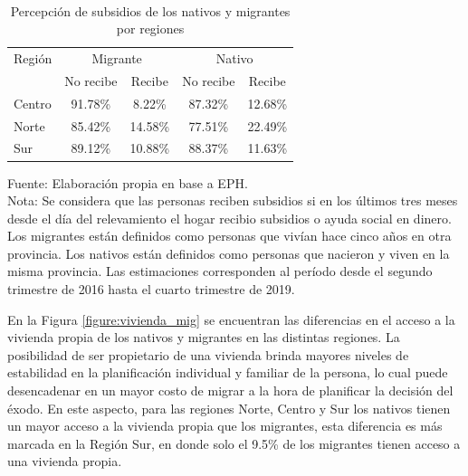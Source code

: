 \documentclass[12pt,a4paper]{article}
\begin{document}
\begin{table}[htbp!]
\caption{\\Percepción de subsidios de los nativos y migrantes por regiones} 
\label{cuadro:subsidio_mig}
\centering
\begin{tabular}{lcccc}
\hline
\multicolumn{1}{c}{Región} & \multicolumn{2}{c}{Migrante} & \multicolumn{2}{c}{Nativo} \\ \cline{2-5} 
                           & No recibe      & Recibe      & No recibe     & Recibe     \\ \hline
Centro                     & 91.78\%        & 8.22\%      & 87.32\%       & 12.68\%    \\ 
Norte                      & 85.42\%        & 14.58\%     & 77.51\%       & 22.49\%    \\ 
Sur                        & 89.12\%        & 10.88\%     & 88.37\%       & 11.63\%    \\ \hline
\end{tabular}
\begin{flushleft}
\begin{scriptsize}
Fuente: Elaboración propia en base a EPH.\\
Nota: Se considera que las personas reciben subsidios si en los últimos tres meses desde el día del relevamiento el hogar recibio subsidios o ayuda social en dinero. Los migrantes están definidos como personas que vivían hace cinco años en otra provincia. Los nativos están definidos como personas que nacieron y viven en la misma provincia. Las estimaciones corresponden al período desde el segundo trimestre de 2016 hasta el cuarto trimestre de 2019.\\
\end{scriptsize}
\end{flushleft}
\end{table}

En la Figura \ref{figure:vivienda_mig} se encuentran las diferencias en el acceso a la vivienda propia de los nativos y migrantes  en las distintas regiones. La posibilidad de ser propietario de una vivienda brinda mayores niveles de estabilidad en la planificación individual y familiar de la persona, lo cual puede desencadenar en un mayor costo de migrar a la hora de planificar la decisión del éxodo. En este aspecto, para las regiones Norte, Centro y Sur los nativos tienen un mayor acceso a la vivienda propia que los migrantes, esta diferencia es más marcada en la Región Sur, en donde solo el 9.5\% de los migrantes tienen acceso a una vivienda propia.
\end{document}
